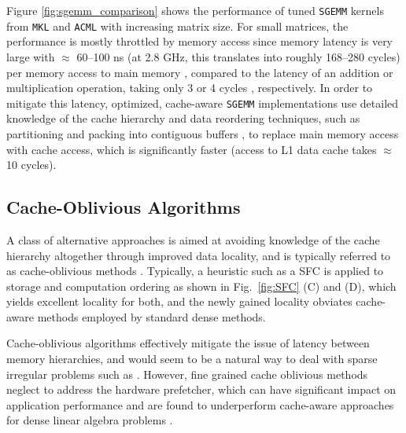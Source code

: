 Figure \ref{fig:sgemm_comparison} shows the performance of tuned {\tt SGEMM}
kernels from {\tt MKL} \cite{intelMKL} and {\tt ACML} \cite{amdACML} with
increasing matrix size. For small matrices, the performance is mostly
throttled by memory access since memory latency is very large with $\approx$
60--100 ns (at 2.8 GHz, this translates into roughly 168--280 cycles) per
memory access to main memory \cite[Table 2]{IntelPerformance}, compared to the
latency of an addition or multiplication operation, taking only 3 or 4 cycles
\cite[Xeon X5650, Appendix C]{Intel2009}, respectively.  In order to mitigate
this latency, optimized, cache-aware {\tt SGEMM} implementations use detailed
knowledge of the cache hierarchy and data reordering techniques, such as
partitioning and packing into contiguous buffers \cite{Goto2002,
Goto:2008:AHM:1356052.1356053, Goto:2008:HIL:1377603.1377607,
gustavson2011parallel}, to replace main memory access with cache access, which
is significantly faster (access to L1 data cache takes $\approx$ 10 cycles).

\subsection{Cache-Oblivious Algorithms}

A class of alternative approaches is aimed at avoiding knowledge of the cache
hierarchy altogether through improved data locality, and is typically referred
to as cache-oblivious methods \cite{bader08hardware-oriented, Jin2005,
Wise:2001:LSM:568014.379559, Thiyagalingam03improvingthe,
Hanlon:2001:CCM:565761.565766, Adams:2006:SOS, Frigo:1999:CA:795665.796479,
OlsonSkov2002, Gottschling:2007:RMA:1274971.1274989,
Lorton:2006:ABL:1166133.1166134, Gabriel:2004:OCR:1054943.1054962,
mellor2001improving}. Typically, a heuristic such as a SFC is applied to
storage and computation ordering as shown in Fig.~\ref{fig:SFC} (C) and (D),
which yields excellent locality for both, and the newly gained locality
obviates cache-aware methods employed by standard dense methods.

Cache-oblivious algorithms effectively mitigate the issue of latency between
memory hierarchies, and would seem to be a natural way to deal with sparse
irregular problems such as \SpAMM{}. However, fine grained cache oblivious
methods neglect to address the hardware prefetcher, which can have significant
impact on application performance \cite{Pan07algorithmsto, Dick2007} and are
found to underperform cache-aware approaches for dense linear algebra problems
\cite{yotov2007experimental, gunnels2007cache}.

